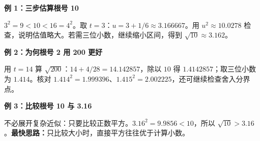 \clearpage
\begin{examplebox}
\textbf{\textcolor{CExample}{例 1：三步估算根号 10}}
\par\medskip
\begin{center}

\end{center}
\medskip
$3^2=9<10<16=4^2$。取 $t=3$：$u=3+1/6\approx3.166667$。用 $u^2\approx10.0278$ 检查，说明估值略大。若需三位小数，继续缩小区间，得到 $\sqrt{10}\approx3.162$。
\end{examplebox}
\clearpage
\begin{examplebox}
\textbf{\textcolor{CExample}{例 2：为何根号 2 用 200 更好}}
\par\medskip
\begin{center}

\end{center}
\medskip
用 $t=14$ 算 $\sqrt{200}$：$14+4/28=14.142857$，除以 $10$ 得 $1.4142857$；取三位小数为 $1.414$。核对 $1.414^2=1.999396$、$1.415^2=2.002225$，还可继续检查舍入分界点。
\end{examplebox}
\clearpage
\begin{examplebox}
\textbf{\textcolor{CExample}{例 3：比较根号 10 与 3.16}}
\par\medskip
\begin{center}

\end{center}
\medskip
不必展开复杂近似：只要比较正数平方。$3.16^2=9.9856<10$，所以 $\sqrt{10}>3.16$。\textbf{最快思路：}只比较大小时，直接平方往往优于计算小数。
\end{examplebox}
